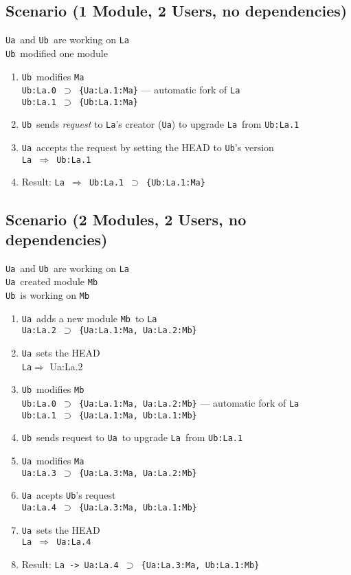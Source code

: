 \documentclass[10pt]{article}
\def\Ua{{\tt Ua}}
\def\Ub{{\tt Ub}}
\def\La{{\tt La}}
\def\Ma{{\tt Ma}}
\def\Mb{{\tt Mb}}
\def\headsto{${\Longrightarrow}$ }
\def\hto{\headsto}
\def\eq{${\supset}$ }
\begin{document}
	\subsection{Scenario (1 Module, 2 Users, no dependencies)}
		\Ua\ and \Ub\ are working on \La\\
		\Ub\ modified one module

		\begin{enumerate}
			\item{\Ub\ modifies \Ma\\
            		{\tt Ub:La.0 \eq \{Ua:La.1:Ma\}} --- automatic fork of \La\\
				{\tt Ub:La.1 \eq \{Ub:La.1:Ma\}}
			}
			\item{\Ub\ sends {\em request} to \La's creator (\Ua) to upgrade \La\ from {\tt Ub:La.1}}
			\item{\Ua\ accepts the request by setting the HEAD to \Ub's version\\
				{\tt La \hto  Ub:La.1}
			}
			\item{Result: {\tt La \hto  Ub:La.1 \eq \{Ub:La.1:Ma\}}}
		\end{enumerate}

	\subsection{Scenario (2 Modules, 2 Users, no dependencies)}

		\Ua\ and \Ub\ are working on \La\\ 
		\Ua\ created module \Mb\\
		\Ub\ is working on \Mb\
		
		\begin{enumerate}
			\item{\Ua\ adds a new module \Mb\ to \La\\
				{\tt Ua:La.2 \eq \{Ua:La.1:Ma, Ua:La.2:Mb\}}
			}
			\item{\Ua\ sets the HEAD\\
				{\La \hto Ua:La.2}
			}
			\item{\Ub\ modifies \Mb\\				
				{\tt Ub:La.0 \eq \{Ua:La.1:Ma, Ua:La.2:Mb\}} --- automatic fork of \La\\
				{\tt Ub:La.1 \eq \{Ua:La.1:Ma, Ub:La.1:Mb\}}
			}
			\item{\Ub\ sends request to \Ua\ to upgrade \La\ from {\tt Ub:La.1}}
			\item{\Ua\ modifies \Ma\\
				{\tt Ua:La.3 \eq \{Ua:La.3:Ma, Ua:La.2:Mb\}}
			}
			\item{\Ua\ acepts \Ub's request\\
				{\tt Ua:La.4 \eq \{Ua:La.3:Ma, Ub:La.1:Mb\}}
			}
			\item{\Ua\ sets the HEAD\\
				{\tt La \hto Ua:La.4}
			}
			\item{Result: {\tt La -> Ua:La.4 \eq \{Ua:La.3:Ma, Ub:La.1:Mb\}}}
		\end{enumerate}
\end{document}
